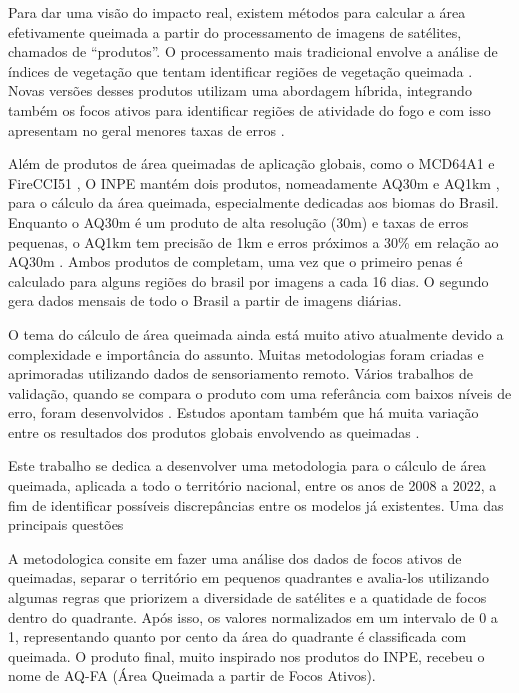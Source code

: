 \documentclass[cic,tc]{iiufrgs}
\begin{document}

Para dar uma visão do impacto real, existem métodos para calcular a área efetivamente queimada a partir do processamento de imagens de satélites, chamados de ``produtos''. O processamento mais tradicional envolve a análise de índices de vegetação que tentam identificar regiões de vegetação queimada \citep{pereira1999}. Novas versões desses produtos utilizam uma abordagem híbrida, integrando também os focos ativos para identificar regiões de atividade do fogo e com isso apresentam no geral menores taxas de erros \citep{BOSCHETTI2019111490}.

Além de produtos de área queimadas de aplicação globais, como o MCD64A1 \citep{GIGLIO201872} e FireCCI51 \citep{Lizundia2020}, O INPE mantém dois produtos, nomeadamente AQ30m \citep{melchiori2014landsat} e AQ1km \citep{libonati2015algorithm}, para o cálculo da área queimada, especialmente dedicadas aos biomas do Brasil. Enquanto o AQ30m é um produto de alta resolução (30m) e taxas de erros pequenas, o AQ1km tem precisão de 1km e erros próximos a 30\% em relação ao AQ30m \cite{PerguntasFrequentesINPE}. Ambos produtos de completam, uma vez que o primeiro penas é calculado para alguns regiões do brasil por imagens a cada 16 dias. O segundo gera dados mensais de todo o Brasil a partir de imagens diárias.  


O tema do cálculo de área queimada ainda está muito ativo atualmente devido a complexidade e importância do assunto. Muitas metodologias foram criadas e aprimoradas utilizando dados de sensoriamento remoto. Vários trabalhos de validação, quando se compara o produto com uma referância com baixos níveis de erro, foram desenvolvidos \citep{BOSCHETTI2016465, BOSCHETTI2019111490}. Estudos apontam também que há muita variação entre os resultados dos produtos globais envolvendo as queimadas \citep{Boschetti2004, Humber2019}. 

Este trabalho se dedica a desenvolver uma metodologia para o cálculo de área queimada, aplicada a todo o território nacional, entre os anos de 2008 a 2022, a fim de identificar possíveis discrepâncias entre os modelos já existentes. Uma das principais questões  



A metodologica consite em fazer uma análise dos dados de focos ativos de queimadas, separar o território em pequenos quadrantes e avalia-los utilizando algumas regras que priorizem a diversidade de satélites e a quatidade de focos dentro do quadrante. Após isso, os valores normalizados em um intervalo de 0 a 1, representando quanto por cento da área do quadrante é classificada com queimada. O produto final, muito inspirado nos produtos do INPE, recebeu o nome de AQ-FA (Área Queimada a partir de Focos Ativos).
\end{document}
